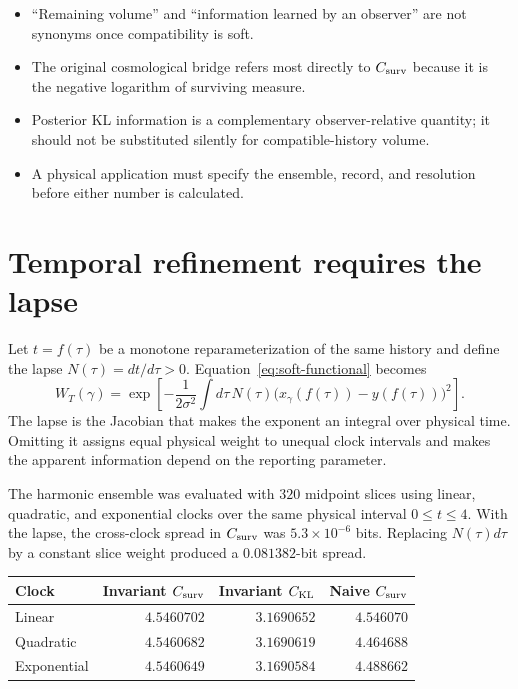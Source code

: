 \documentclass[10pt]{article}
\newenvironment{persuasions}
  {\begin{cpbox}\small\setlength{\parskip}{0pt}%
   {\footnotesize\bfseries\color{accent}%
    \textls[110]{CONCEPTUAL PERSUASIONS}}\par\vspace{3pt}%
   \begin{itemize}[leftmargin=1.15em,itemsep=2.5pt,topsep=0pt,parsep=0pt,
                   label=\textcolor{accent}{\scriptsize$\blacktriangleright$}]}
  {\end{itemize}\end{cpbox}}
\begin{document}
\begin{persuasions}
\item ``Remaining volume'' and ``information learned by an observer'' are not
synonyms once compatibility is soft.
\item The original cosmological bridge refers most directly to
$C_{\rm surv}$ because it is the negative logarithm of surviving measure.
\item Posterior KL information is a complementary observer-relative quantity;
it should not be substituted silently for compatible-history volume.
\item A physical application must specify the ensemble, record, and resolution
before either number is calculated.
\end{persuasions}

\section*{Temporal refinement requires the lapse}

Let $t=f(\tau)$ be a monotone reparameterization of the same history and define
the lapse $N(\tau)=dt/d\tau>0$.  Equation~\eqref{eq:soft-functional} becomes
\begin{equation}
W_T(\gamma)
=\exp\!\left[-\frac{1}{2\sigma^2}
\int d\tau\,N(\tau)
\bigl(x_\gamma(f(\tau))-y(f(\tau))\bigr)^2\right].
\label{eq:lapse-functional}
\end{equation}
The lapse is the Jacobian that makes the exponent an integral over physical
time.  Omitting it assigns equal physical weight to unequal clock intervals
and makes the apparent information depend on the reporting parameter.

The harmonic ensemble was evaluated with $320$ midpoint slices using linear,
quadratic, and exponential clocks over the same physical interval $0\leq
t\leq4$.  With the lapse, the cross-clock spread in $C_{\rm surv}$ was
$5.3\times10^{-6}$ bits.  Replacing $N(\tau)d\tau$ by a constant slice weight
produced a $0.081382$-bit spread.

\begin{center}
\label{tab:clock-test}
\small
\begin{tabular}{lrrr}
\toprule
Clock & Invariant $C_{\rm surv}$ & Invariant $C_{\rm KL}$ & Naive $C_{\rm surv}$\\
\midrule
Linear & $4.5460702$ & $3.1690652$ & $4.546070$\\
Quadratic & $4.5460682$ & $3.1690619$ & $4.464688$\\
Exponential & $4.5460649$ & $3.1690584$ & $4.488662$\\
\bottomrule
\end{tabular}
\end{center}
\end{document}
